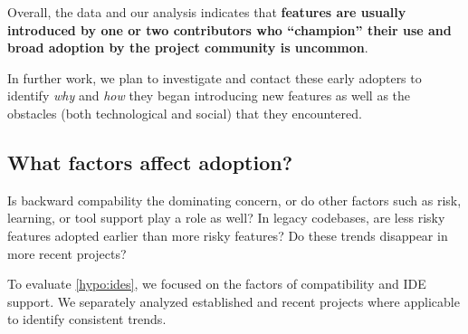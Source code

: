 \documentclass{svjour3}
\begin{document}
Overall, the data and our analysis indicates that \textbf{features are usually
introduced by one or two contributors who ``champion'' their use and broad adoption
by the project community is uncommon}.

In further work, we plan to investigate and contact
these early adopters to identify \emph{why} and \emph{how} they began
introducing new features as well as the obstacles (both technological and social)
that they encountered.

\subsection{What factors affect adoption?}\label{sec:adoptionlag}

Is backward compability the dominating concern, or do other factors such as risk, learning, or tool support play a role as well?
In legacy codebases, are less risky features adopted earlier than more risky features?  Do these trends disappear in more recent projects?


To evaluate \autoref{hypo:ides}, we focused on the factors of compatibility and IDE support.
We separately analyzed established and recent projects where applicable to identify consistent trends.
\end{document}
